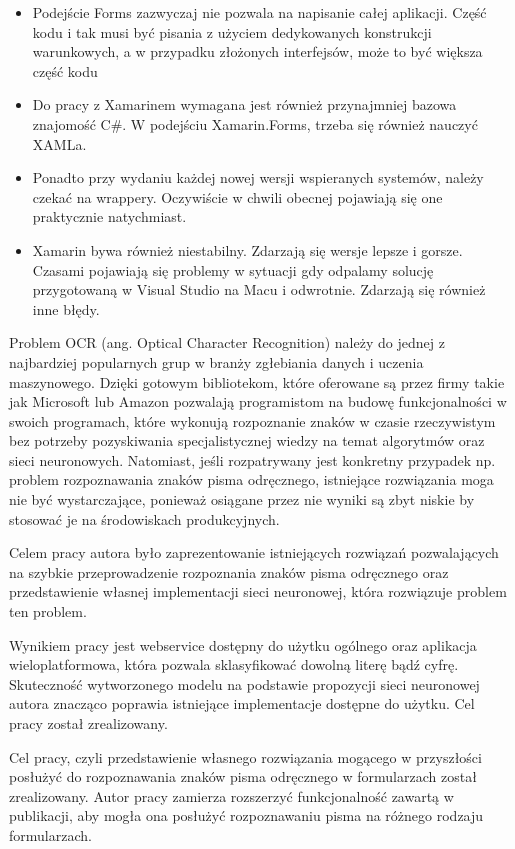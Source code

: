 \documentclass[brudnopis]{xmgr}
\begin{document}
\begin{itemize}
\item
Podejście Forms zazwyczaj nie pozwala na napisanie całej aplikacji. Część kodu i tak musi być pisania z użyciem dedykowanych konstrukcji warunkowych, a w przypadku złożonych interfejsów, może to być większa część kodu
\item
Do pracy z Xamarinem wymagana jest również przynajmniej bazowa znajomość C\#. W podejściu Xamarin.Forms, trzeba się również nauczyć XAMLa.
\item
Ponadto przy wydaniu każdej nowej wersji wspieranych systemów, należy czekać na wrappery. Oczywiście w chwili obecnej pojawiają się one praktycznie natychmiast.
\item
Xamarin bywa również niestabilny. Zdarzają się wersje lepsze i gorsze. Czasami pojawiają się problemy w sytuacji gdy odpalamy solucję przygotowaną w Visual Studio na Macu i odwrotnie. Zdarzają się również inne błędy.

\end{itemize}

\summary

Problem OCR (ang. Optical Character Recognition) należy do jednej z najbardziej popularnych grup w branży zgłebiania danych i uczenia maszynowego. Dzięki gotowym bibliotekom, które oferowane są przez firmy takie jak Microsoft lub Amazon pozwalają programistom na budowę funkcjonalności w swoich programach, które wykonują rozpoznanie znaków w czasie rzeczywistym bez potrzeby pozyskiwania specjalistycznej wiedzy na temat algorytmów oraz sieci neuronowych. Natomiast, jeśli rozpatrywany jest konkretny przypadek np. problem rozpoznawania znaków pisma odręcznego, istniejące rozwiązania moga nie być wystarczające, ponieważ osiągane przez nie wyniki są zbyt niskie by stosować je na środowiskach produkcyjnych.

Celem pracy autora było zaprezentowanie istniejących rozwiązań pozwalających na szybkie przeprowadzenie rozpoznania znaków pisma odręcznego oraz przedstawienie własnej implementacji sieci neuronowej, która rozwiązuje problem ten problem. 

Wynikiem pracy jest webservice dostępny do użytku ogólnego oraz aplikacja wieloplatformowa, która pozwala sklasyfikować dowolną literę bądź cyfrę. Skuteczność wytworzonego modelu na podstawie propozycji sieci neuronowej autora znacząco poprawia istniejące implementacje dostępne do użytku. Cel pracy został zrealizowany.

Cel pracy, czyli przedstawienie własnego rozwiązania mogącego w przyszłości posłużyć do rozpoznawania znaków pisma odręcznego w formularzach został zrealizowany. Autor pracy zamierza rozszerzyć funkcjonalność zawartą w publikacji, aby mogła ona posłużyć rozpoznawaniu pisma na różnego rodzaju formularzach.
\end{document}

